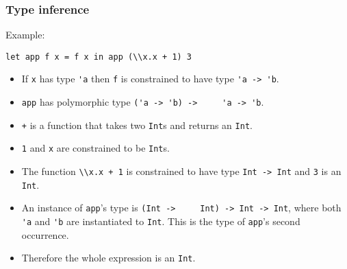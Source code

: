 \documentclass[12pt,red]{beamer}
\begin{document}
\begin{frame}
  \frametitle{Type inference}

  Example:
  \begin{beamerboxesrounded}[shadow=true]{}
    \begin{center}
      \lstinline{let app f x = f x in app (\\x.x + 1) 3}
    \end{center}
  \end{beamerboxesrounded}

  \begin{itemize}
  \item If \lstinline{x} has type \lstinline{'a} then \lstinline{f} is
    constrained to have type \lstinline{'a -> 'b}.

  \item \lstinline{app} has polymorphic type \lstinline{('a -> 'b) ->
    'a -> 'b}.

  \item \lstinline{+} is a function that takes two \lstinline{Int}s
    and returns an \lstinline{Int}.

  \item \lstinline{1} and \lstinline{x} are constrained to be
    \lstinline{Int}s.

  \item The function \lstinline{\\x.x + 1} is constrained to have type
    \lstinline{Int -> Int} and \lstinline{3} is an \lstinline{Int}.

  \item An instance of \lstinline{app}'s type is \lstinline{(Int ->
    Int) -> Int -> Int}, where both \lstinline{'a} and \lstinline{'b}
    are instantiated to \lstinline{Int}.  This is the type of
    \lstinline{app}'s second occurrence.

  \item Therefore the whole expression is an \lstinline{Int}.
  \end{itemize}
\end{frame}
\end{document}

